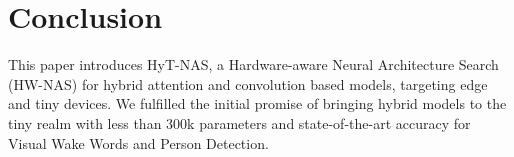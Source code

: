 \documentclass[conference]{IEEEtran}
\begin{document}
 
\section{Conclusion}
This paper introduces HyT-NAS, a Hardware-aware Neural Architecture Search (HW-NAS) for hybrid attention and convolution based models, targeting edge and tiny devices.
We fulfilled the initial promise of bringing hybrid models to the tiny realm with less than 300k parameters and state-of-the-art accuracy for Visual Wake Words and Person Detection.

\newpage


\end{document}
